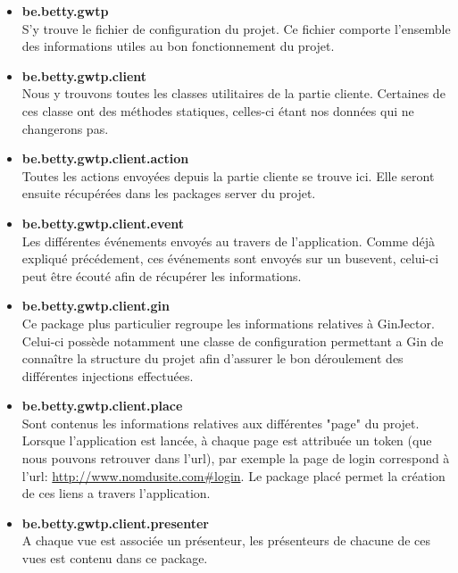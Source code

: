\begin{itemize}
\item \textbf{be.betty.gwtp}\\
	S'y trouve le fichier de configuration du projet. Ce fichier comporte l'ensemble des informations utiles au bon fonctionnement du projet.\\
	
\item \textbf{be.betty.gwtp.client}\\
	Nous y trouvons toutes les classes utilitaires de la partie cliente. Certaines de ces classe ont des méthodes statiques, celles-ci étant nos données qui ne changerons pas.\\
	
\item \textbf{be.betty.gwtp.client.action}\\
	Toutes les actions envoyées depuis la partie cliente se trouve ici. Elle seront ensuite récupérées dans les packages server du projet.\\
	
\item \textbf{be.betty.gwtp.client.event}\\
	Les différentes événements envoyés au travers de l'application. Comme déjà expliqué précédement, ces événements sont envoyés sur un busevent, celui-ci peut être écouté afin de récupérer les informations.\\
	
\item \textbf{be.betty.gwtp.client.gin}\\
	Ce package plus particulier regroupe les informations relatives à GinJector. Celui-ci possède notamment une classe de configuration permettant a Gin de connaître la structure du projet afin d'assurer le bon déroulement des différentes injections effectuées.\\
	
\item \textbf{be.betty.gwtp.client.place}\\
Sont contenus les informations relatives aux différentes "page" du projet. Lorsque l'application est lancée, à chaque page est attribuée un token (que nous pouvons retrouver dans l'url), par exemple la page de login correspond à l'url: \url{http://www.nomdusite.com\#login}. Le package placé permet la création de ces liens a travers l'application.\\

\item \textbf{be.betty.gwtp.client.presenter}\\
A chaque vue est associée un présenteur, les présenteurs de chacune de ces vues est contenu dans ce package.\\


\end{itemize}
